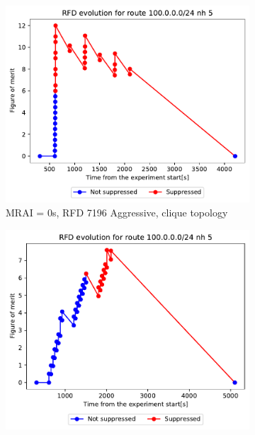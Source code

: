 \begin{figure}[h]
     \centering
     \begin{subfigure}[b]{0.3\textwidth}
         \centering
         \includegraphics[width=\textwidth]{images/RFD/clique/FigureOfMerit/mrai1_RFD_7196_aggressive_x_rfd_R1.pdf}
         \caption{MRAI = 0s, RFD 7196 Aggressive, clique topology}
         \label{fig:clique_x_mrai0_rfd7196Aggressive}
     \end{subfigure}
     \hfill
     \begin{subfigure}[b]{0.3\textwidth}
         \centering
         \includegraphics[width=\textwidth]{images/RFD/clique/FigureOfMerit/mrai11_RFD_7196_aggressive_x_rfd_R1.pdf}

\end{subfigure}
\end{figure}
